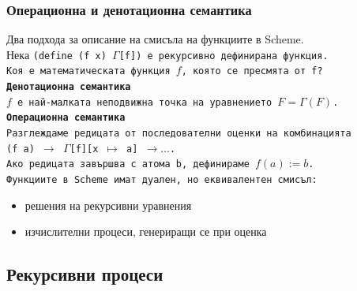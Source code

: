 \documentclass{beamer}
\begin{document}
\begin{frame}
  \frametitle{Операционна и денотационна семантика}

  Два подхода за описание на смисъла на функциите в Scheme.\\
  \pause
  Нека \tt{(define (f x) $\Gamma$[f])} е рекурсивно дефинирана функция.\\
  \pause
  \alert{Коя е математическата функция $f$, която се пресмята от \tt f?}\\[1em]
  \pause
  \textbf{Денотационна семантика}\\
  $f$ е най-малката неподвижна точка на уравнението $F = \Gamma(F)$.\\[1em]
  \pause
  \textbf{Операционна семантика}\\
  Разглеждаме редицата от последователни оценки на комбинацията\\
  \tt{(f a)} $\rightarrow$ \tt{$\Gamma$[f][x $\mapsto$ a]} $\rightarrow\ldots$.\\
  Ако редицата завършва с атома \tt b, дефинираме $f(a) := b$.\\[1em]
  \pause
  \alert{Функциите в Scheme имат дуален, но еквивалентен смисъл:}
  \begin{itemize}
  \item решения на рекурсивни уравнения
  \item изчислителни процеси, генериращи се при оценка
  \end{itemize}
\end{frame}

\subsection{Рекурсивни процеси}
\end{document}
